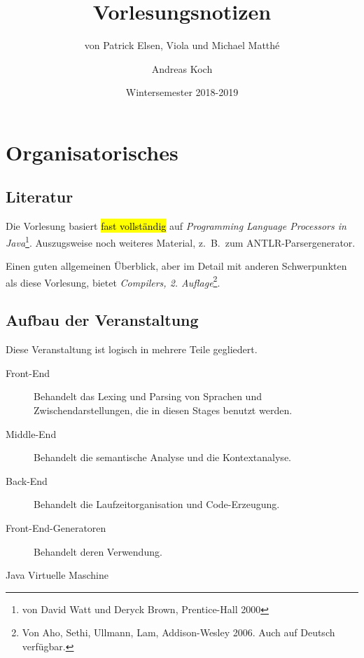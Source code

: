 \documentclass[
  ngerman,
  DIV=12
]{scrartcl}
\title{Vorlesungsnotizen}
\date{Wintersemester 2018-2019}
\author{Andreas Koch}
\subtitle{von Patrick Elsen, Viola und Michael Matthé}
\begin{document}
\maketitle
  
\tableofcontents
\newpage
  
\section{Organisatorisches}
   
\subsection{Literatur}
 
Die Vorlesung basiert \hl{fast vollständig} auf \emph{Programming Language Processors in Java}\footnote{von David Watt und Deryck Brown, Prentice-Hall 2000}. Auszugsweise noch weiteres Material, z.\ B.\ zum ANTLR-Parsergenerator.

Einen guten allgemeinen Überblick, aber im Detail mit anderen Schwerpunkten als diese Vorlesung, bietet \emph{Compilers, 2. Auflage}\footnote{Von Aho, Sethi, Ullmann, Lam, Addison-Wesley 2006. Auch auf Deutsch verfügbar.}.
 
\subsection{Aufbau der Veranstaltung}

Diese Veranstaltung ist logisch in mehrere Teile gegliedert.

\begin{description}
  \item[Front-End\footnotemark] Behandelt das Lexing und Parsing von Sprachen und Zwischendarstellungen, die in diesen Stages benutzt werden.
  \item[Middle-End] Behandelt die semantische Analyse und die Kontextanalyse.
  \item[Back-End] Behandelt die Laufzeitorganisation und Code-Erzeugung.
  \item[Front-End-Generatoren] Behandelt deren Verwendung.
  \item[Java Virtuelle Maschine] 
\end{description}
\end{document}

